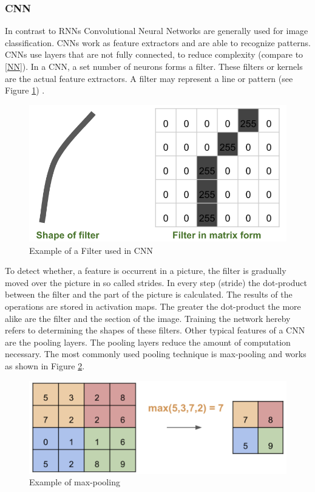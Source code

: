 \subsubsection{CNN} \label{CNN}
In contrast to RNNs Convolutional Neural Networks are generally used for image classification. CNNs work as feature extractors and are able to recognize patterns. CNNs use layers that are not fully connected, to reduce complexity (compare to \ref{NN}). In a CNN, a set number of neurons forms a filter. These filters or kernels are the actual feature extractors. A filter may represent a line or pattern (see Figure \ref{fig:filter}) \parencite{LeCun1998}.

\begin{figure}[h]
	\centering
	\includegraphics[scale=0.7]{Figures/filter}
	\decoRule
	\caption[Example of a Filter used in CNN]{Example of a Filter used in CNN \parencite{RichStureborg2019}}
	\label{fig:filter}
\end{figure}

To detect whether, a feature is occurrent in a picture, the filter is gradually moved over the picture in so called strides. In every step (stride) the dot-product between the filter and the part of the picture is calculated. The results of the operations are stored in activation maps.  The greater the dot-product the more alike are the filter and the section of the image. Training the network hereby refers to determining the shapes of these filters.
Other typical features of a CNN are the pooling layers. The pooling layers reduce the amount of computation necessary. The most commonly used pooling technique is max-pooling and works as shown in Figure \ref{fig:pooling}.

\begin{figure}[h]
	\centering
	\includegraphics[scale=0.2]{Figures/pooling}
	\decoRule
	\caption[Example of max-pooling]{Example of max-pooling \parencite{RichStureborg2019}}
	\label{fig:pooling}
\end{figure}

